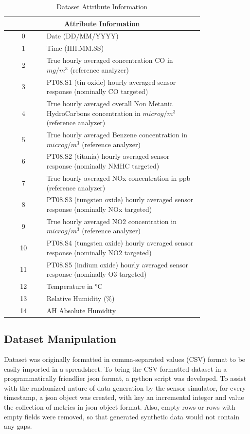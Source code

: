 \begin{table}[!h]
\begin{tabular}{|c|p{0.8\linewidth}|}
    \hline
    \multicolumn{2}{|c|}{\textbf{Attribute Information}} \\
    \hline
    \hline
    0& Date (DD/MM/YYYY) \\ \hline
    1& Time (HH.MM.SS) \\ \hline
    2& True hourly averaged concentration CO in $mg/m^3$ (reference analyzer) \\ \hline
    3& PT08.S1 (tin oxide) hourly averaged sensor response (nominally CO targeted) \\ \hline
    4& True hourly averaged overall Non Metanic HydroCarbons concentration in $microg/m^3$ (reference analyzer) \\ \hline
    5& True hourly averaged Benzene concentration in $microg/m^3$ (reference analyzer) \\ \hline
    6& PT08.S2 (titania) hourly averaged sensor response (nominally NMHC targeted) \\ \hline
    7& True hourly averaged NOx concentration in ppb (reference analyzer) \\ \hline
    8& PT08.S3 (tungsten oxide) hourly averaged sensor response (nominally NOx targeted) \\ \hline
    9& True hourly averaged NO2 concentration in $microg/m^3$ (reference analyzer) \\ \hline
    10& PT08.S4 (tungsten oxide) hourly averaged sensor response (nominally NO2 targeted) \\ \hline
    11& PT08.S5 (indium oxide) hourly averaged sensor response (nominally O3 targeted) \\ \hline
    12& Temperature in °C \\ \hline
    13& Relative Humidity (\%) \\ \hline
    14& AH Absolute Humidity  \\ \hline
\end{tabular}
\centering
\caption{Dataset Attribute Information}
\label{fig:dataset_attri}
\end{table}

\subsection{Dataset Manipulation}
Dataset was originally formatted in comma-separated values (CSV) format to be easily imported in a spreadsheet. To bring the CSV formatted dataset in a programmatically friendlier json format, a python script was developed. 
To assist with the randomized nature of data generation by the sensor simulator, for every timestamp, a json object was created, with key an incremental integer and value the collection of metrics in json object format. Also, empty rows or rows with empty fields were removed, so that generated synthetic data would not contain any gaps.

